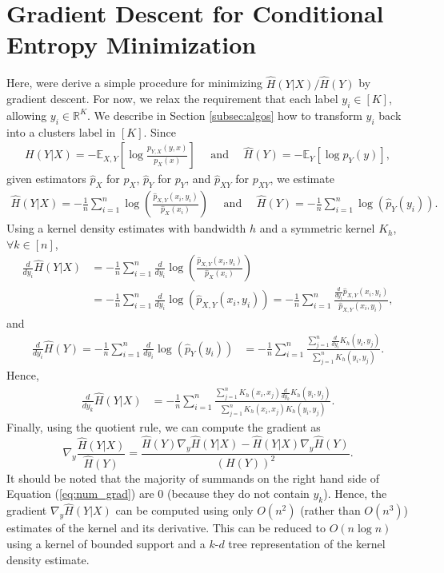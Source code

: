 \documentclass{article} %
\newcommand{\R}{{\mathbb{R}}}
\newcommand{\E}{{\mathbb{E}}}
\begin{document}
\section{Gradient Descent for Conditional Entropy Minimization}
\label{sec:grad_desc}
Here, were derive a simple procedure for minimizing $\hat H(Y|X)/\hat H(Y)$ by
gradient descent. For now, we relax the requirement that each label
$y_i \in [K]$, allowing $y_i \in \R^K$. We describe in Section
\ref{subsec:algos} how to transform $y_i$ back into a clusters label in $[K]$.
Since
\begin{align*}
H(Y | X) = -\E_{X,Y} \left[ \log \frac{p_{Y,X}(y,x)}{p_X(x)} \right]
    \quad \mbox{ and } \quad
    \hat H(Y) = -\E_Y \left[ \log p_Y(y) \right],
\end{align*}
given estimators $\hat p_X$ for $p_X$, $\hat p_Y$ for $p_Y$, and $\hat p_{XY}$
for $p_{XY}$, we estimate 
\begin{align*}
\hat H(Y|X)
    = - \frac{1}{n} \sum_{i = 1}^n
            \log \left( \frac{\hat p_{X,Y}(x_i,y_i)}{\hat p_X(x_i)} \right)
    \quad \mbox{ and } \quad
    \hat H(Y)
        = - \frac{1}{n} \sum_{i = 1}^n \log \left( \hat p_Y(y_i) \right).
\end{align*}
Using a kernel density estimates with bandwidth $h$ and a symmetric
kernel $K_h$, $\forall k \in [n]$,
\begin{align*}
\frac{d}{dy_i} \hat H(Y|X)
 &  = - \frac{1}{n} \sum_{i = 1}^n \frac{d}{dy_i}
        \log \left( \frac{\hat p_{X,Y}(x_i,y_i)}{\hat p_X(x_i)} \right) \\
 &  = - \frac{1}{n} \sum_{i = 1}^n \frac{d}{dy_i}
        \log \left( \hat p_{X,Y}(x_i,y_i) \right)
    = - \frac{1}{n} \sum_{i = 1}^n
            \frac{\frac{d}{dy_i} \hat p_{X,Y}(x_i,y_i)}{\hat p_{X,Y}(x_i,y_i)},
\end{align*}
and
\begin{align*}
\frac{d}{dy_i} \hat H(Y)
    = - \frac{1}{n} \sum_{i = 1}^n
                        \frac{d}{dy_i} \log \left( \hat p_Y(y_i) \right)
 &  = - \frac{1}{n} \sum_{i = 1}^n
                        \frac{\sum_{j = 1}^n \frac{d}{dy_i} K_h(y_i,y_j)}
                             {\sum_{j = 1}^n K_h(y_i,y_j)}.
\end{align*}
Hence,
\begin{align}
\frac{d}{dy_k} \hat H(Y|X)
 &  = - \frac{1}{n} \sum_{i = 1}^n
            \frac{\sum_{j = 1}^n
            K_h(x_i,x_j) \frac{d}{dy_k} K_h(y_i,y_j)}
            {\sum_{j = 1}^n K_h(x_i,x_j)K_h(y_i,y_j)}.
\label{eq:num_grad}
\end{align}
Finally, using the quotient rule, we can compute the gradient as
\[\nabla_y \frac{\hat H(Y | X)}{\hat H(Y)}
    = \frac{\hat H(Y) \nabla_y \hat H(Y|X) - \hat H(Y|X) \nabla_y \hat H(Y)}
           {(H(Y))^2}.
\]
It should be noted that the majority of summands on the right hand side of
Equation (\ref{eq:num_grad}) are $0$ (because they do not contain $y_k$).
Hence, the gradient $\nabla_y \hat H(Y | X)$ can be computed using only
$O(n^2)$ (rather than $O(n^3)$) estimates of the kernel and its derivative.
This can be reduced to $O(n \log n)$ using a kernel of bounded support and a
$k$-$d$ tree representation of the kernel density estimate.
\end{document}
